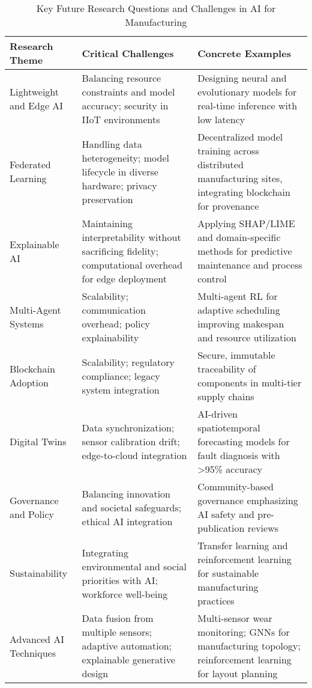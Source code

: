 \documentclass[sigconf]{acmart}
\begin{document}
\begin{table*}[htbp]
\centering
\caption{Key Future Research Questions and Challenges in AI for Manufacturing}
\label{tab:future_research}
\begin{adjustbox}{max width=\textwidth}
\begin{tabular}{@{}lll@{}}
\toprule
\textbf{Research Theme} & \textbf{Critical Challenges} & \textbf{Concrete Examples} \\
\midrule
Lightweight and Edge AI & Balancing resource constraints and model accuracy; security in IIoT environments & Designing neural and evolutionary models for real-time inference with low latency~\cite{ref31} \\

Federated Learning & Handling data heterogeneity; model lifecycle in diverse hardware; privacy preservation & Decentralized model training across distributed manufacturing sites, integrating blockchain for provenance~\cite{ref6,ref25,ref41} \\

Explainable AI & Maintaining interpretability without sacrificing fidelity; computational overhead for edge deployment & Applying SHAP/LIME and domain-specific methods for predictive maintenance and process control~\cite{ref30,ref35,ref38} \\

Multi-Agent Systems & Scalability; communication overhead; policy explainability & Multi-agent RL for adaptive scheduling improving makespan and resource utilization~\cite{ref29,ref37} \\

Blockchain Adoption & Scalability; regulatory compliance; legacy system integration & Secure, immutable traceability of components in multi-tier supply chains~\cite{ref25,ref41} \\

Digital Twins & Data synchronization; sensor calibration drift; edge-to-cloud integration & AI-driven spatiotemporal forecasting models for fault diagnosis with >95\% accuracy~\cite{ref26,ref38} \\

Governance and Policy & Balancing innovation and societal safeguards; ethical AI integration & Community-based governance emphasizing AI safety and pre-publication reviews~\cite{ref25,ref44} \\

Sustainability & Integrating environmental and social priorities with AI; workforce well-being & Transfer learning and reinforcement learning for sustainable manufacturing practices~\cite{ref5,ref6,ref44} \\

Advanced AI Techniques & Data fusion from multiple sensors; adaptive automation; explainable generative design & Multi-sensor wear monitoring; GNNs for manufacturing topology; reinforcement learning for layout planning~\cite{ref9,ref31,ref34,ref39} \\
\bottomrule
\end{tabular}
\end{adjustbox}
\end{table*}
\end{document}
